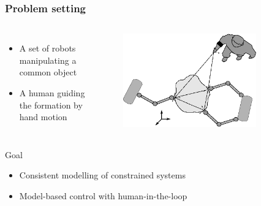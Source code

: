 \documentclass[student]{ITRslides}
\begin{document}
\begin{frame}
	\frametitle{Problem setting}
		\begin{columns}
	\begin{itemize}
	\item A set of robots manipulating a common object
	\item A human guiding the formation by hand motion
	\end{itemize}
		
	
	
			\begin{figure}
			\centering
			\includegraphics[width=0.8\textwidth]{general_setup.eps}

			\end{figure}
	\end{columns}
	\vspace{10pt}
	\begin{block}{Goal}
	\begin{itemize}
	\item Consistent modelling of constrained systems 
	\item Model-based control with human-in-the-loop
	\end{itemize}
	\end{block}	

\end{frame}
\end{document}
